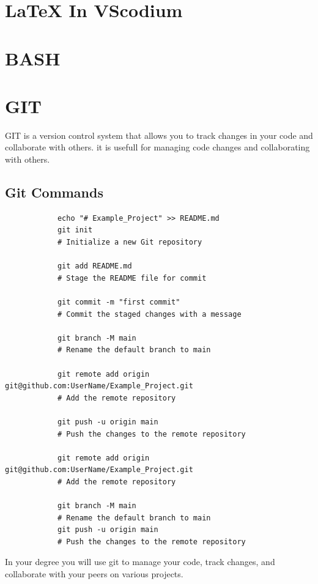 \documentclass[a4paper,11pt]{article}
\begin{document}
\section{LaTeX In VScodium}

\section{BASH}

\section{GIT}

    GIT is a version control system that allows you to track changes in your code and collaborate with others.
    it is usefull for managing code changes and collaborating with others.

    \subsection{Git Commands}

        \begin{verbatim}
            echo "# Example_Project" >> README.md
            git init                        
            # Initialize a new Git repository
            
            git add README.md               
            # Stage the README file for commit

            git commit -m "first commit"    
            # Commit the staged changes with a message

            git branch -M main              
            # Rename the default branch to main

            git remote add origin git@github.com:UserName/Example_Project.git 
            # Add the remote repository
            
            git push -u origin main         
            # Push the changes to the remote repository

            git remote add origin git@github.com:UserName/Example_Project.git 
            # Add the remote repository
            
            git branch -M main              
            # Rename the default branch to main
            git push -u origin main         
            # Push the changes to the remote repository
        \end{verbatim}

        In your  degree you will use git to manage your code, track changes, and collaborate with your peers on various projects.
\end{document}
